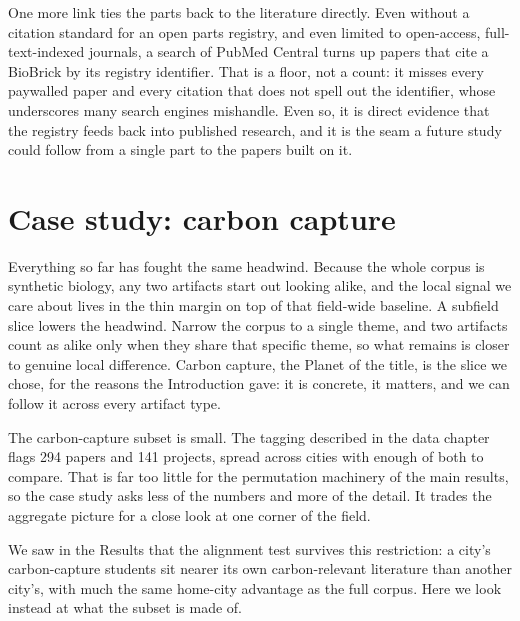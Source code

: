 \documentclass[12pt,a4paper]{article}
\begin{document}
	One more link ties the parts back to the literature directly. Even without a
	citation standard for an open parts registry, and even limited to open-access,
	full-text-indexed journals, a search of PubMed Central turns up
	\statNBiobrickPapers{} papers that cite a BioBrick by its registry identifier. That
	is a floor, not a count: it misses every paywalled paper and every citation that
	does not spell out the identifier, whose underscores many search engines mishandle.
	Even so, it is direct evidence that the registry feeds back into published research,
	and it is the seam a future study could follow from a single part to the papers
	built on it.
	
	\section{Case study: carbon capture}
	
	Everything so far has fought the same headwind. Because the whole corpus is
	synthetic biology, any two artifacts start out looking alike, and the local signal
	we care about lives in the thin margin on top of that field-wide baseline. A
	subfield slice lowers the headwind. Narrow the corpus to a single theme, and two
	artifacts count as alike only when they share that specific theme, so what remains
	is closer to genuine local difference. Carbon capture, the Planet of the title, is
	the slice we chose, for the reasons the Introduction gave: it is concrete, it
	matters, and we can follow it across every artifact type.
	
	The carbon-capture subset is small. The tagging described in the data chapter flags
	294 papers and 141 projects, spread across \statCcAlignNCities{} cities with enough
	of both to compare. That is far too little for the permutation machinery of the
	main results, so the case study asks less of the numbers and more of the detail. It
	trades the aggregate picture for a close look at one corner of the field.
	
	We saw in the Results that the alignment test survives this restriction: a city's
	carbon-capture students sit nearer its own carbon-relevant literature than another
	city's, with much the same home-city advantage as the full corpus. Here we look
	instead at what the subset is made of.
	
\end{document}
